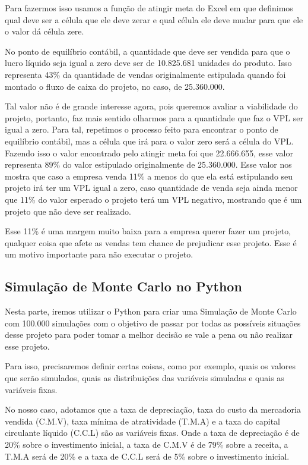 \documentclass[11pt]{article}
\begin{document}
Para fazermos isso usamos a função de atingir meta do Excel em que definimos qual deve ser a célula que ele deve zerar e qual célula ele deve mudar para que ele o valor dá célula zere.

No ponto de equilíbrio contábil, a quantidade que deve ser vendida para que o lucro líquido seja igual a zero deve ser de 10.825.681 unidades do produto. Isso representa 43\% da quantidade de vendas originalmente estipulada quando foi montado o fluxo de caixa do projeto, no caso, de 25.360.000.

Tal valor não é de grande interesse agora, pois queremos avaliar a viabilidade do projeto, portanto, faz mais sentido olharmos para a quantidade que faz o VPL ser igual a zero. Para tal, repetimos o processo feito para encontrar o ponto de equilíbrio contábil, mas a célula que irá para o valor zero será a célula do VPL. Fazendo isso o valor encontrado pelo atingir meta foi que 22.666.655, esse valor representa 89\% do valor estipulado originalmente de 25.360.000. Esse valor nos mostra que caso a empresa venda 11\% a menos do que ela está estipulando seu projeto irá ter um VPL igual a zero, caso quantidade de venda seja ainda menor que 11\% do valor esperado o projeto terá um VPL negativo, mostrando que é um projeto que não deve ser realizado.

Esse 11\% é uma margem muito baixa para a empresa querer fazer um projeto, qualquer coisa que afete as vendas tem chance de prejudicar esse projeto. Esse é um motivo importante para não executar o projeto.

\subsection{\textbf{Simulação de Monte Carlo no Python}}
Nesta parte, iremos utilizar o Python para criar uma Simulação de Monte Carlo com 100.000 simulações com o objetivo de passar por todas as possíveis situações desse projeto para poder tomar a melhor decisão se vale a pena ou não realizar esse projeto.

Para isso, precisaremos definir certas coisas, como por exemplo, quais os valores que serão simulados, quais as distribuições das variáveis simuladas e quais as variáveis fixas.

No nosso caso, adotamos que a taxa de depreciação, taxa do custo da mercadoria vendida (C.M.V), taxa mínima de atratividade (T.M.A) e a taxa do capital circulante líquido (C.C.L) são as variáveis fixas. Onde a taxa de depreciação é de 20\% sobre o investimento inicial, a taxa de C.M.V é de 79\% sobre a receita, a T.M.A será de 20\% e a taxa de C.C.L será de 5\% sobre o investimento inicial.
\end{document}
